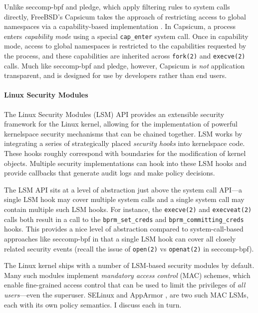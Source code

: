 \documentclass[dvipsnames, 12pt]{article}
\begin{document}
Unlike seccomp-bpf and pledge, which apply filtering rules to system calls
directly, FreeBSD's Capsicum takes the approach of restricting access to global
namespaces via a capability-based implementation \cite{watson2010_capsicum}. In
Capsicum, a process enters \textit{capability mode}  using a special
\texttt{cap\_enter} system call. Once in capability mode, access to global
namespaces is restricted to the capabilities requested by the process, and these
capabilities are inherited across \texttt{fork(2)} and \texttt{execve(2)} calls.
Much like seccomp-bpf and pledge, however, Capsicum is \textit{not} application
transparent, and is designed for use by developers rather than end users.

\paragraph*{Linux Security Modules}
The Linux Security Modules (LSM) API \cite{wright2002_lsm} provides an
extensible security framework for the Linux kernel, allowing for the
implementation of powerful kernelspace security mechanisms that can be chained
together. LSM works by integrating a series of strategically placed
\textit{security hooks} into kernelspace code. These hooks roughly correspond
with boundaries for the modification of kernel objects. Multiple security
implementations can hook into these LSM hooks and provide callbacks that
generate audit logs and make policy decisions.

The LSM API sits at a level of abstraction just above the system call API---a
single LSM hook may cover multiple system calls and a single system call may
contain multiple such LSM hooks. For instance, the \texttt{execve(2)} and
\texttt{execveat(2)} calls both result in a call to the
\texttt{bprm\_set\_creds} and  \texttt{bprm\_committing\_creds} hooks. This
provides a nice level of abstraction compared to system-call-based approaches
like seccomp-bpf \cite{seccomp_bpf, drewry2012_seccomp_bpf} in that a single LSM
hook can cover all closely related security events (recall the issue of
\texttt{open(2)} vs \texttt{openat(2)} in seccomp-bpf).

The Linux kernel ships with a number of LSM-based security modules by default.
Many such modules implement \textit{mandatory access control} (MAC) schemes,
which enable fine-grained access control that can be used to limit the
privileges of \textit{all users}---even the superuser. SELinux
\cite{smalley2001_selinux} and AppArmor \cite{cowan2000_apparmor}, are two such
MAC LSMs, each with its own policy semantics. I discuss each in turn.
\end{document}
